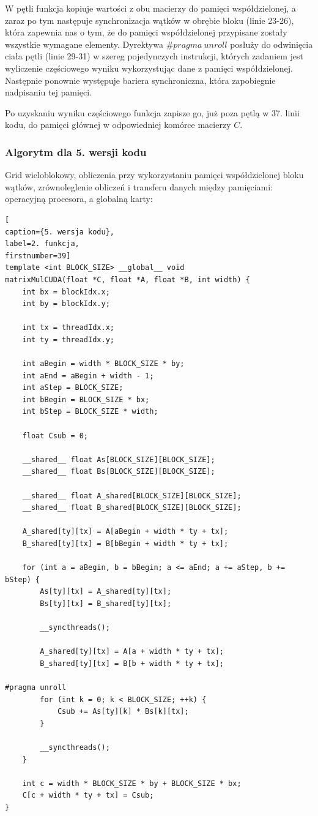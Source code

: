 \documentclass{article}
\begin{document}
W pętli funkcja kopiuje wartości z obu macierzy do pamięci współdzielonej, a zaraz po tym następuje synchronizacja wątków w obrębie bloku (linie 23-26), która zapewnia nas o tym, że do pamięci współdzielonej przypisane zostały wszystkie wymagane elementy. Dyrektywa $\#pragma\ unroll$ posłuży do odwinięcia ciała pętli (linie 29-31) w szereg pojedynczych instrukcji, których zadaniem jest wyliczenie częściowego wyniku wykorzystując dane z pamięci współdzielonej. Następnie ponownie występuje bariera synchroniczna, która zapobiegnie nadpisaniu tej pamięci.

Po uzyskaniu wyniku częściowego funkcja zapisze go, już poza pętlą w 37. linii kodu, do pamięci głównej w odpowiedniej komórce macierzy $C$.

\subsubsection{Algorytm dla 5. wersji kodu}
Grid wieloblokowy, obliczenia przy wykorzystaniu pamięci współdzielonej bloku wątków, zrównoleglenie obliczeń i transferu danych między pamięciami: operacyjną procesora, a globalną karty:

\begin{lstlisting}[
caption={5. wersja kodu},
label=2. funkcja,
firstnumber=39]
template <int BLOCK_SIZE> __global__ void
matrixMulCUDA(float *C, float *A, float *B, int width) {
    int bx = blockIdx.x;
    int by = blockIdx.y;
    
    int tx = threadIdx.x;
    int ty = threadIdx.y;

    int aBegin = width * BLOCK_SIZE * by;
    int aEnd = aBegin + width - 1;
    int aStep = BLOCK_SIZE;
    int bBegin = BLOCK_SIZE * bx;
    int bStep = BLOCK_SIZE * width;

    float Csub = 0;
    
    __shared__ float As[BLOCK_SIZE][BLOCK_SIZE];
    __shared__ float Bs[BLOCK_SIZE][BLOCK_SIZE];

    __shared__ float A_shared[BLOCK_SIZE][BLOCK_SIZE];
    __shared__ float B_shared[BLOCK_SIZE][BLOCK_SIZE];

    A_shared[ty][tx] = A[aBegin + width * ty + tx];
    B_shared[ty][tx] = B[bBegin + width * ty + tx];

    for (int a = aBegin, b = bBegin; a <= aEnd; a += aStep, b += bStep) {
        As[ty][tx] = A_shared[ty][tx];
        Bs[ty][tx] = B_shared[ty][tx];

        __syncthreads();

        A_shared[ty][tx] = A[a + width * ty + tx];
        B_shared[ty][tx] = B[b + width * ty + tx];

#pragma unroll
        for (int k = 0; k < BLOCK_SIZE; ++k) {
            Csub += As[ty][k] * Bs[k][tx];
        }

        __syncthreads();
    }

    int c = width * BLOCK_SIZE * by + BLOCK_SIZE * bx;
    C[c + width * ty + tx] = Csub;
}
\end{lstlisting}
\end{document}
